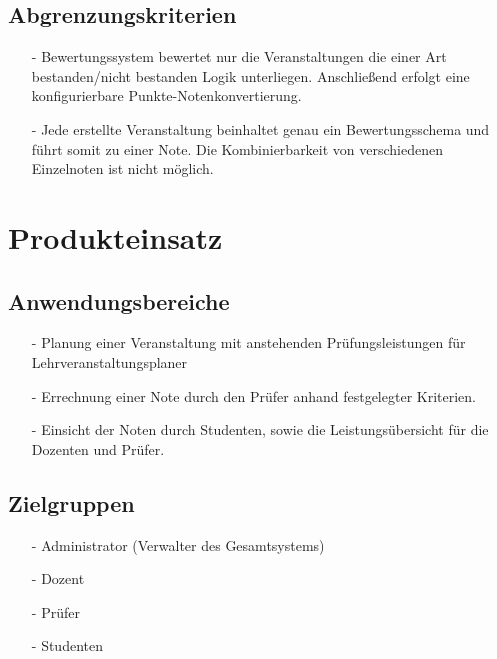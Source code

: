 		\subsection{Abgrenzungskriterien}
		\begin{itemize}
		\item[-]	Bewertungssystem bewertet nur die Veranstaltungen die einer Art bestanden/nicht bestanden Logik unterliegen. Anschließend erfolgt eine konfigurierbare Punkte-Notenkonvertierung.
		\item[-]	Jede erstellte Veranstaltung beinhaltet genau ein Bewertungsschema und führt somit zu einer Note. Die Kombinierbarkeit von verschiedenen Einzelnoten ist nicht möglich.
		\end{itemize}
		
	\section{Produkteinsatz}
	
		
		\subsection{Anwendungsbereiche}
		\begin{itemize}
		\item[-]	Planung einer Veranstaltung mit anstehenden Prüfungsleistungen für Lehrveranstaltungsplaner
		\item[-]	Errechnung einer Note durch den Prüfer anhand festgelegter Kriterien.
		\item[-]	Einsicht der Noten durch Studenten, sowie die Leistungsübersicht für die Dozenten und Prüfer.
		\end{itemize}
		
		
		\subsection{Zielgruppen}
		\begin{itemize}
		\item[-] 	Administrator (Verwalter des Gesamtsystems)
		\item[-]	Dozent
		\item[-]	Prüfer
		\item[-]	Studenten
		\end{itemize}

